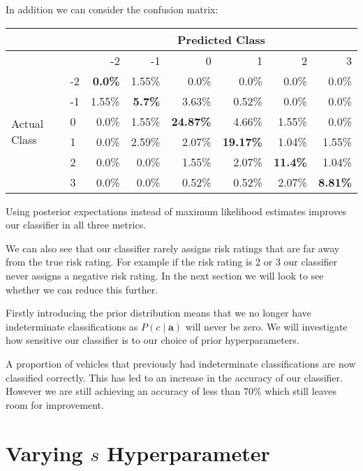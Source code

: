 In addition we can consider the confusion matrix:
\begin{center}
    \begin{tabular}{l l r r r r r r}
    \hline
                       &    & \multicolumn{6}{c}{Predicted Class}                   \\
    \hline
                       &    & -2      & -1    & 0       & 1       & 2       & 3     \\
    \hline
    \multirow{6}{*}{Actual Class} & -2 & \textbf{0.0\%}  & 1.55\% & 0.0\%   & 0.0\%   & 0.0\%  & 0.0\%  \\
                       & -1 & 1.55\% & \textbf{5.7\%}   & 3.63\%  & 0.52\%  & 0.0\%  & 0.0\%  \\
                       & 0  & 0.0\%  & 1.55\% & \textbf{24.87\%}  & 4.66\%  & 1.55\% & 0.0\%  \\
                       & 1  & 0.0\%  & 2.59\% & 2.07\%  & \textbf{19.17\%}  & 1.04\% & 1.55\% \\
                       & 2  & 0.0\%  & 0.0\%  & 1.55\%  & 2.07\%  & \textbf{11.4\%}  & 1.04\% \\
                       & 3  & 0.0\%  & 0.0\%  & 0.52\%  & 0.52\%  & 2.07\% & \textbf{8.81\%} \\
    \hline
    \end{tabular}
\end{center}

Using posterior expectations instead of maximum likelihood estimates improves our classifier in all three metrics.

We can also see that our classifier rarely assigns risk ratings that are far away from the true risk rating.
For example if the risk rating is 2 or 3 our classifier never assigns a negative risk rating.
In the next section we will look to see whether we can reduce this further.

Firstly introducing the prior distribution means that we no longer have indeterminate classifications as $P(c \mid \mathbf{a})$ will never be zero.
We will investigate how sensitive our classifier is to our choice of prior hyperparameters.

A proportion of vehicles that previously had indeterminate classifications are now classified correctly.
This has led to an increase in the accuracy of our classifier.
However we are still achieving an accuracy of less than 70\% which still leaves room for improvement.

\section{Varying $s$ Hyperparameter}

